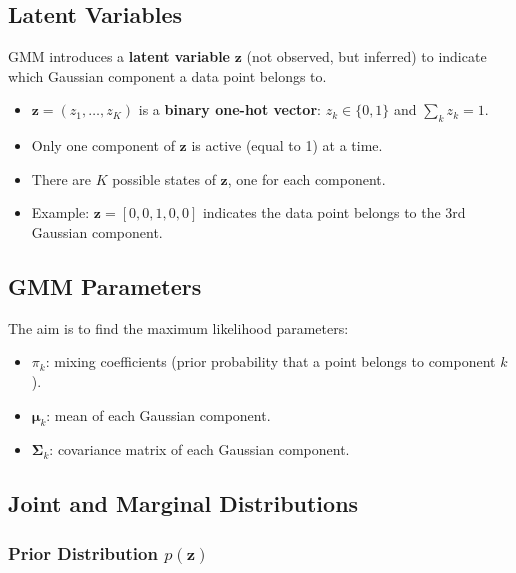 \documentclass[11pt,a4paper]{article}
\theoremstyle{definition}
\theoremstyle{plain}
\theoremstyle{remark}
\begin{document}
\subsection{Latent Variables}

GMM introduces a \textbf{latent variable} $\mathbf{z}$ (not observed, but inferred) to indicate which Gaussian component a data point belongs to.

\begin{tcolorbox}[colback=green!5!white,colframe=green!75!black,title=\textbf{Latent Variable $\mathbf{z}$}]
\begin{itemize}
    \item $\mathbf{z} = (z_1, \dots, z_K)$ is a \textbf{binary one-hot vector}: $z_k \in \{0, 1\}$ and $\sum_{k} z_k = 1$.
    \item Only one component of $\mathbf{z}$ is active (equal to 1) at a time.
    \item There are $K$ possible states of $\mathbf{z}$, one for each component.
    \item Example: $\mathbf{z} = [0, 0, 1, 0, 0]$ indicates the data point belongs to the 3rd Gaussian component.
\end{itemize}
\end{tcolorbox}

\subsection{GMM Parameters}

The aim is to find the maximum likelihood parameters:
\begin{itemize}
    \item $\pi_k$: mixing coefficients (prior probability that a point belongs to component $k$).
    \item $\boldsymbol{\mu}_k$: mean of each Gaussian component.
    \item $\boldsymbol{\Sigma}_k$: covariance matrix of each Gaussian component.
\end{itemize}

\subsection{Joint and Marginal Distributions}

\subsubsection{Prior Distribution $p(\mathbf{z})$}
\end{document}
